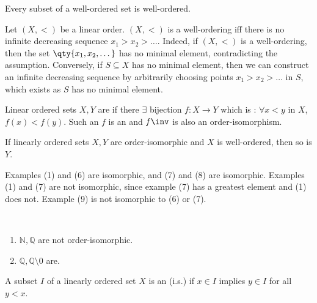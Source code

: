 \begin{note}
    Every subset of a well-ordered set is well-ordered.
\end{note}

\begin{remark}
    Let $(X, <)$ be a linear order.
    $(X, <)$ is a well-ordering iff there is no infinite decreasing sequence $x_1 > x_2 > \dots$.
    Indeed, if $(X, <)$ is a well-ordering, then the set $\qty{x_1, x_2, \dots}$ has no minimal element, contradicting the assumption.
    Conversely, if $S \subseteq X$ has no minimal element, then we can construct an infinite decreasing sequence by arbitrarily choosing points $x_1 > x_2 > \dots$ in $S$, which exists as $S$ has no minimal element.
\end{remark}

\begin{definition}
    Linear ordered sets $X, Y$ are  if there $\exists$ bijection $f : X \to Y$ which is : $\forall x < y$ in $X$, $f(x) < f(y)$.
    Such an $f$ is an  and $f\inv$ is also an order-isomorphism.
\end{definition}

\begin{note}
    If linearly ordered sets $X, Y$ are order-isomorphic and $X$ is well-ordered, then so is $Y$.
\end{note}

Examples (1) and (6) are isomorphic, and (7) and (8) are isomorphic.
Examples (1) and (7) are not isomorphic, since example (7) has a greatest element and (1) does not.
Example (9) is not isomorphic to (6) or (7).

\begin{example} ~\vspace*{-1.5\baselineskip}
    \begin{enumerate}
        \item $\mathbb{N}, \mathbb{Q}$ are not order-isomorphic.
        \item $\mathbb{Q}, \mathbb{Q} \setminus \qty{0}$ are.
    \end{enumerate}
\end{example}

\begin{definition}
    A subset $I$ of a linearly ordered set $X$ is an  (i.s.) if $x \in I$ implies $y \in I$ for all $y < x$.
\end{definition}

